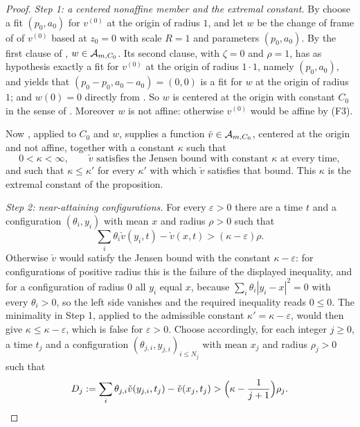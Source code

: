\begin{proof}
\emph{Step 1: a centered nonaffine member and the extremal constant.}
By  choose a fit $(p_0,a_0)$ for $v^{(0)}$ at the origin of
radius $1$, and let $w$ be the change of frame of  of
$v^{(0)}$ based at $z_0=0$ with scale $R=1$ and parameters $(p_0,a_0)$. By the
first clause of , $w\in\mathcal{A}_{m,C_0}$. Its second
clause, with $\zeta=0$ and $\rho=1$, has as hypothesis exactly a fit for
$v^{(0)}$ at the origin of radius $1\cdot1$, namely $(p_0,a_0)$, and yields that
$(p_0-p_0,a_0-a_0)=(0,0)$ is a fit for $w$ at the origin of radius $1$; and
$w(0)=0$ directly from . So $w$ is centered at the origin
with constant $C_0$ in the sense of . Moreover $w$ is not
affine: otherwise $v^{(0)}$ would be affine by (F3).

Now , applied to $C_0$ and $w$, supplies a
function $\check v\in\mathcal{A}_{m,C_0}$, centered at the origin and not affine,
together with a constant $\kappa$ such that
\begin{equation}\label{eq:ec-kappa}
  0<\kappa<\infty,\qquad
  \check v\text{ satisfies the Jensen bound with constant }\kappa
  \text{ at every time},
\end{equation}
and such that $\kappa\le\kappa'$ for every $\kappa'$ with which $\check v$
satisfies that bound. This $\kappa$ is the extremal constant of the proposition.

\emph{Step 2: near-attaining configurations.}
For every $\varepsilon>0$ there are a time $t$ and a configuration
$(\theta_i,y_i)$ with mean $x$ and radius $\rho>0$ such that
\[
  \sum_i\theta_i\check v(y_i,t)-\check v(x,t)>(\kappa-\varepsilon)\rho .
\]
Otherwise $\check v$ would satisfy the Jensen bound with the constant
$\kappa-\varepsilon$: for configurations of positive radius this is the failure
of the displayed inequality, and for a configuration of radius $0$ all $y_i$
equal $x$, because $\sum_i\theta_i|y_i-x|^2=0$ with every $\theta_i>0$, so the
left side vanishes and the required inequality reads $0\le0$. The minimality in
Step 1, applied to the admissible constant $\kappa'=\kappa-\varepsilon$, would
then give $\kappa\le\kappa-\varepsilon$, which is false for $\varepsilon>0$.
Choose accordingly, for each integer $j\ge0$, a time $t_j$ and a configuration
$(\theta_{j,i},y_{j,i})_{i\le N_j}$ with mean $x_j$ and radius $\rho_j>0$ such
that
\begin{equation}\label{eq:ec-near}
  D_j:=\sum_i\theta_{j,i}\check v(y_{j,i},t_j)-\check v(x_j,t_j)
     >\Bigl(\kappa-\frac1{j+1}\Bigr)\rho_j .
\end{equation}


\end{proof}
